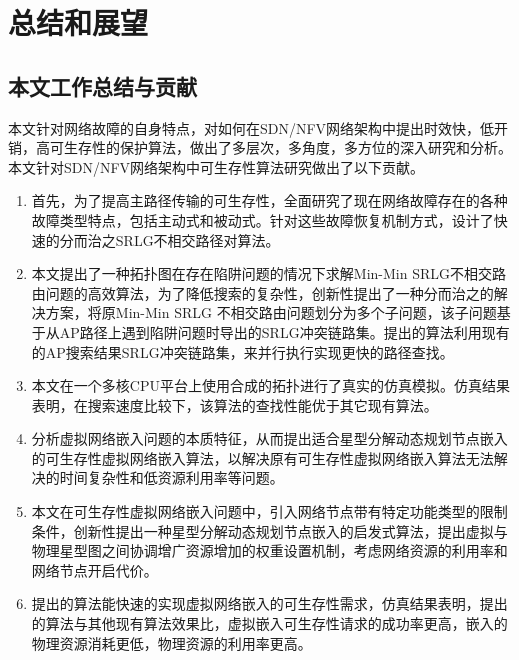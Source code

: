 
\chapter{总结和展望}
\section{本文工作总结与贡献}
本文针对网络故障的自身特点，对如何在SDN/NFV网络架构中提出时效快，低开销，高可生存性的保护算法，做出了多层次，多角度，多方位的深入研究和分析。本文针对SDN/NFV网络架构中可生存性算法研究做出了以下贡献。
\begin{enumerate}
  \item 首先，为了提高主路径传输的可生存性，全面研究了现在网络故障存在的各种故障类型特点，包括主动式和被动式。针对这些故障恢复机制方式，设计了快速的分而治之SRLG不相交路径对算法。
  \item 本文提出了一种拓扑图在存在陷阱问题的情况下求解Min-Min SRLG不相交路由问题的高效算法，为了降低搜索的复杂性，创新性提出了一种分而治之的解决方案，将原Min-Min SRLG 不相交路由问题划分为多个子问题，该子问题基于从AP路径上遇到陷阱问题时导出的SRLG冲突链路集。提出的算法利用现有的AP搜索结果SRLG冲突链路集，来并行执行实现更快的路径查找。
  \item 本文在一个多核CPU平台上使用合成的拓扑进行了真实的仿真模拟。仿真结果表明，在搜索速度比较下，该算法的查找性能优于其它现有算法。
  \item 分析虚拟网络嵌入问题的本质特征，从而提出适合星型分解动态规划节点嵌入的可生存性虚拟网络嵌入算法，以解决原有可生存性虚拟网络嵌入算法无法解决的时间复杂性和低资源利用率等问题。
  \item 本文在可生存性虚拟网络嵌入问题中，引入网络节点带有特定功能类型的限制条件，创新性提出一种星型分解动态规划节点嵌入的启发式算法，提出虚拟与物理星型图之间协调增广资源增加的权重设置机制，考虑网络资源的利用率和网络节点开启代价。
  \item   提出的算法能快速的实现虚拟网络嵌入的可生存性需求，仿真结果表明，提出的算法与其他现有算法效果比，虚拟嵌入可生存性请求的成功率更高，嵌入的物理资源消耗更低，物理资源的利用率更高。
\end{enumerate}



